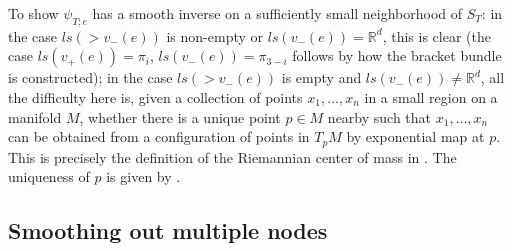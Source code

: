 \documentclass[11pt]{article}
\theoremstyle{definition}
\theoremstyle{remark}
\def\R{\mathbb{R}}
\begin{document}
To show $\psi_{T;e}$ has a smooth inverse on a sufficiently small neighborhood of $S_T$: in the case $ls(>v_-(e))$ is non-empty or $ls(v_-(e))=\R^d$, this is clear (the case $ls(v_+(e))=\pi_i$, $ls(v_-(e))=\pi_{3-i}$ follows by how the bracket bundle is constructed); in the case $ls(>v_-(e))$ is empty and $ls(v_-(e))\neq\R^d$, all the difficulty here is, given a collection of points $x_1,\ldots,x_n$ in a small region on a manifold $M$, whether there is a unique point $p\in M$ nearby such that $x_1,\ldots,x_n$ can be obtained from a configuration of points in $T_pM$ by exponential map at $p$. This is precisely the definition of the Riemannian center of mass in \cite{GroveKarcher}. The uniqueness of $p$ is given by \cite[Proposition 3.1]{GroveKarcher}. 


\subsection{Smoothing out multiple nodes}
\end{document}
